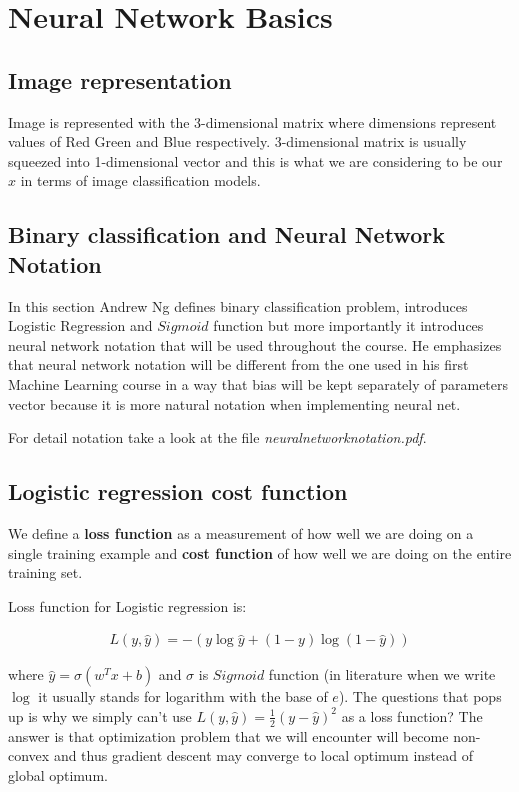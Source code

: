 \documentclass[a4paper]{report}
\begin{document}
\section{Neural Network Basics}

\subsection{Image representation}
Image is represented with the 3-dimensional matrix where dimensions represent values of Red Green and Blue respectively. 3-dimensional matrix is usually squeezed into 1-dimensional vector and this is what we are considering to be our $x$ in terms of image classification models.

\subsection{Binary classification and Neural Network Notation}
In this section Andrew Ng defines binary classification problem, introduces Logistic Regression and $Sigmoid$ function but more importantly it introduces neural network notation that will be used throughout the course. He emphasizes that neural network notation will be different from the one used in his first Machine Learning course in a way that bias will be kept separately of parameters vector because it is more natural notation when implementing neural net.

For detail notation take a look at the file \textit{neuralnetworknotation.pdf}.

\subsection{Logistic regression cost function}
We define a \textbf{loss function} as a measurement of how well we are doing on a single training example and \textbf{cost function} of how well we are doing on the entire training set.

Loss function for Logistic regression is:

\begin{align}
L(y, \hat{y}) = -(y\log{\hat{y}} + (1 - y)\log{(1 - \hat{y})})
\end{align}

where $\hat{y} = \sigma(w^Tx + b)$ and $\sigma$ is $Sigmoid$ function (in literature when we write $\log$ it usually stands for logarithm with the base of $e$).
	The questions that pops up is why we simply can't use $L(y, \hat{y}) = \frac{1}{2}(y - \hat{y})^2$ as a loss function? The answer is that optimization problem that we will encounter will become non-convex and thus gradient descent may converge to local optimum instead of global optimum.
\end{document}
